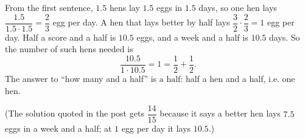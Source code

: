 From the first sentence, $1.5$ hens lay $1.5$ eggs in $1.5$ days, so one hen lays $\dfrac{1.5}{1.5\cdot1.5}=\dfrac23$ egg per day. A hen that lays better by half lays $\dfrac32\cdot\dfrac23=1$ egg per day. Half a score and a half is $10.5$ eggs, and a week and a half is $10.5$ days. So the number of such hens needed is
\[\dfrac{10.5}{1\cdot10.5}=1=\dfrac12+\dfrac12.\]
The answer to ``how many and a half'' is $\boxed{\text{a half}}$: half a hen and a half, i.e. one hen.

(The solution quoted in the post gets $\dfrac{14}{15}$ because it says a better hen lays $7.5$ eggs in a week and a half; at $1$ egg per day it lays $10.5$.)
